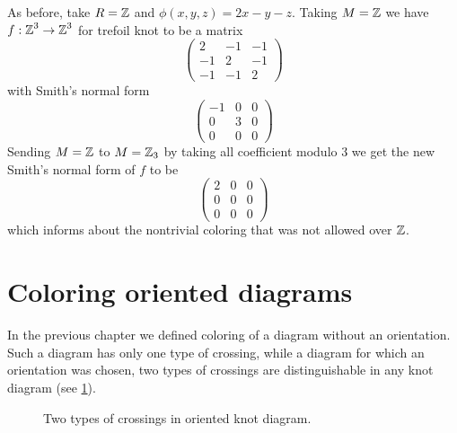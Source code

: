 \begin{example}
  As before, take $R=\operatorname{\mathbb{Z}}$ and $\phi(x, y, z)=2x-y-z$. Taking $M=\operatorname{\mathbb{Z}}$ we have $f:\operatorname{\mathbb{Z}}^3\to \operatorname{\mathbb{Z}}^3$ for trefoil knot to be a matrix
  $$ 
  \begin{pmatrix}
    2 & -1 & -1 \\ 
    -1 & 2 & -1 \\ 
    -1 & -1 & 2
  \end{pmatrix}
  $$ 
  with Smith's normal form
  $$
  \begin{pmatrix}
    -1 & 0 & 0 \\ 
    0 & 3 & 0\\ 
    0 & 0 & 0
  \end{pmatrix}
  $$
  Sending $M=\operatorname{\mathbb{Z}}$ to $M=\operatorname{\mathbb{Z}}_3$ by taking all coefficient modulo $3$ we get the new Smith's normal form of $f$ to be
  $$
  \begin{pmatrix}
    2 & 0 & 0 \\ 
    0 & 0 & 0\\ 
    0 & 0 & 0
  \end{pmatrix}
  $$
  which informs about the nontrivial coloring that was not allowed over $\operatorname{\mathbb{Z}}$.
\end{example}

\section{Coloring oriented diagrams}

In the previous chapter we defined coloring of a diagram without an orientation. Such a diagram has only one type of crossing, while a diagram for which an orientation was chosen, two types of crossings are distinguishable in any knot diagram (see \cref{fig two crossings}).

\begin{figure}[h]\centering 
    \caption{\label{fig two crossings} Two types of crossings in oriented knot diagram.}
\end{figure}

